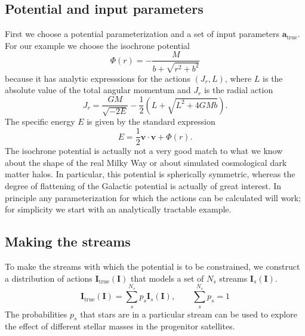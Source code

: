 \documentclass[useAMS,usenatbib,a4paper]{mn2e}
\newcommand{\sub}[2]{\ensuremath{#1_{\mathrm{#2}}}}
\newcommand{\half}{\frac{1}{2}}
\begin{document}
\subsection{Potential and input parameters}
First we choose a potential parameterization and a set of input parameters $\sub{\mathbf{a}}{true}$. For our example we choose the isochrone potential
\begin{equation}
 \Phi(r) = -\frac{M}{b+\sqrt{r^2+b^2}}
\end{equation} 
 because it has analytic expresssions for the actions $(J_r,L)$, where $L$ is the absolute value of the total angular momentum and $J_r$ is the radial action
\begin{equation}
 J_r = \frac{G M}{\sqrt{-2E}} - \half \left(L+\sqrt{L^2 + 4 G M b}\right).
\end{equation}
The specific energy $E$ is given by the standard expression
\begin{equation}
 E = \half \mathbf{v}\cdot\mathbf{v} + \Phi(r).
\end{equation} 
The isochrone potential is actually not a very good match to what we know about the shape of the real Milky Way or about simulated cosmological dark matter halos. In particular, this potential is spherically symmetric, whereas the degree of flattening of the Galactic potential is actually of great interest. In principle any parameterization for which the actions can be calculated will work; for simplicity we start with an analytically tractable example.

\subsection{Making the streams}
To make the streams with which the potential is to be constrained, we construct a distribution of actions $\sub{\mathbf{I}}{true}(\mathbf{I})$ that models a set of $N_s$ streams $\mathbf{I}_s(\mathbf{I})$.
\begin{equation}
 \sub{\mathbf{I}}{true}(\mathbf{I}) = \sum_s^{N_s} p_s \mathbf{I}_s(\mathbf{I}), \qquad \sum_s^{N_s} p_s = 1
\end{equation} 
The probabilities $p_s$ that stars are in a particular stream can be used to explore the effect of different stellar masses in the progenitor satellites. 
\end{document}
